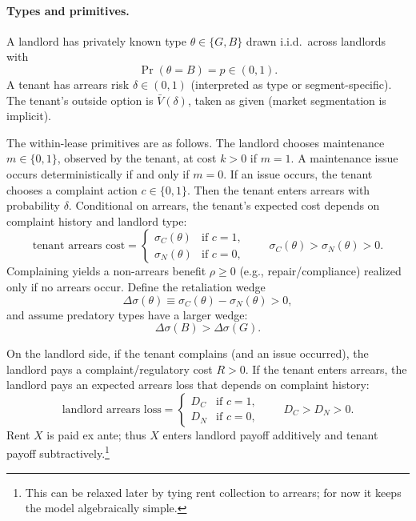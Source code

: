 \documentclass[11pt]{article}
\begin{document}
\paragraph{Types and primitives.}
A landlord has privately known type $\theta\in\{G,B\}$ drawn i.i.d.\ across landlords with
\[
\Pr(\theta=B)=p\in(0,1).
\]
A tenant has arrears risk $\delta\in(0,1)$ (interpreted as type or segment-specific). The tenant's outside option is $\bar V(\delta)$, taken as given (market segmentation is implicit).

The within-lease primitives are as follows. The landlord chooses maintenance $m\in\{0,1\}$, observed by the tenant, at cost $k>0$ if $m=1$. A maintenance issue occurs deterministically if and only if $m=0$. If an issue occurs, the tenant chooses a complaint action $c\in\{0,1\}$. Then the tenant enters arrears with probability $\delta$. Conditional on arrears, the tenant's expected cost depends on complaint history and landlord type:
\[
\text{tenant arrears cost} =
\begin{cases}
\sigma_C(\theta) & \text{if } c=1,\\
\sigma_N(\theta) & \text{if } c=0,
\end{cases}
\qquad \sigma_C(\theta)>\sigma_N(\theta)>0.
\]
Complaining yields a non-arrears benefit $\rho\ge 0$ (e.g., repair/compliance) realized only if no arrears occur. Define the retaliation wedge
\[
\Delta\sigma(\theta)\equiv \sigma_C(\theta)-\sigma_N(\theta)>0,
\]
and assume predatory types have a larger wedge:
\[
\Delta\sigma(B)>\Delta\sigma(G).
\]

On the landlord side, if the tenant complains (and an issue occurred), the landlord pays a complaint/regulatory cost $R>0$. If the tenant enters arrears, the landlord pays an expected arrears loss that depends on complaint history:
\[
\text{landlord arrears loss} =
\begin{cases}
D_C & \text{if } c=1,\\
D_N & \text{if } c=0,
\end{cases}
\qquad D_C>D_N>0.
\]
Rent $X$ is paid ex ante; thus $X$ enters landlord payoff additively and tenant payoff subtractively.\footnote{This can be relaxed later by tying rent collection to arrears; for now it keeps the model algebraically simple.}
\end{document}
